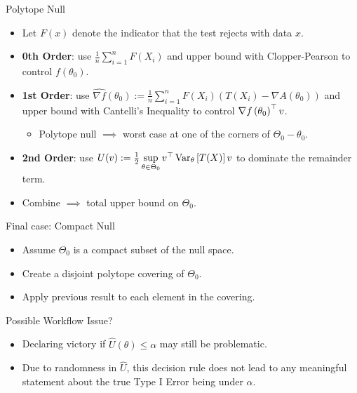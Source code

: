 \begin{frame}{Polytope Null}
\begin{itemize}
    \item Let $F(x)$ denote the indicator that the test rejects with data $x$.
    \item \textbf{0th Order}: use $\frac{1}{n} \sum\limits_{i=1}^n F(X_i)$ and upper bound with Clopper-Pearson to control $f(\theta_0)$.
    \item \textbf{1st Order}: use $\widehat{\nabla f}(\theta_0) := \frac{1}{n} \sum\limits_{i=1}^n F(X_i) (T(X_i) - \nabla A(\theta_0))$
        and upper bound with Cantelli's Inequality to control $\nabla f\left( \theta_0 \right)^\top v$.
        \begin{itemize}
            \item Polytope null $\implies$ worst case at one of the corners of $\Theta_0-\theta_0$.
        \end{itemize}
    \item \textbf{2nd Order}: use $U(v) := \frac{1}{2} \sup\limits_{\theta \in \Theta_0} v^\top \operatorname{Var}_\theta\left[T(X)\right] v$ 
        to dominate the remainder term.
    \item Combine $\implies$ total upper bound on $\Theta_0$.
\end{itemize}
\end{frame}

\begin{frame}{Final case: Compact Null}
\begin{itemize}
    \item Assume $\Theta_0$ is a compact subset of the null space.
    \item Create a disjoint polytope covering of $\Theta_0$.
    \item Apply previous result to each element in the covering.
\end{itemize}
\end{frame}

\begin{frame}{Possible Workflow Issue?}
\begin{itemize}
    \item Declaring victory if $\hat{U}(\theta) \leq \alpha$ may still be problematic.
    \item Due to randomness in $\hat{U}$, this decision rule does not lead to any meaningful statement about the true Type I Error being under $\alpha$.
\end{itemize}
\end{frame}

